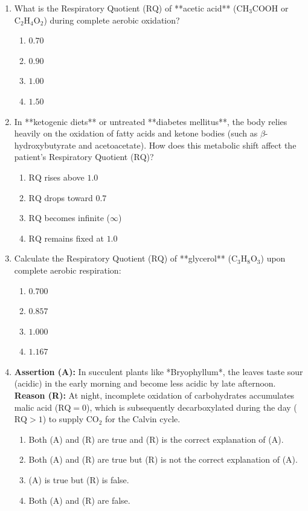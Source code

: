 \documentclass[11pt, a4paper]{article}
\begin{document}
\begin{enumerate}[label=\textbf{\arabic*.}]
\item What is the Respiratory Quotient ($\text{RQ}$) of **acetic acid** ($\text{CH}_3\text{COOH}$ or $\text{C}_2\text{H}_4\text{O}_2$) during complete aerobic oxidation?
\begin{enumerate}[label=(\Alph*)]
    \item $0.70$
    \item $0.90$
    \item $1.00$
    \item $1.50$
\end{enumerate}

\item In **ketogenic diets** or untreated **diabetes mellitus**, the body relies heavily on the oxidation of fatty acids and ketone bodies (such as $\beta$-hydroxybutyrate and acetoacetate). How does this metabolic shift affect the patient's Respiratory Quotient ($\text{RQ}$)?
\begin{enumerate}[label=(\Alph*)]
    \item $\text{RQ}$ rises above $1.0$
    \item $\text{RQ}$ drops toward $0.7$
    \item $\text{RQ}$ becomes infinite ($\infty$)
    \item $\text{RQ}$ remains fixed at $1.0$
\end{enumerate}

\item Calculate the Respiratory Quotient ($\text{RQ}$) of **glycerol** ($\text{C}_3\text{H}_8\text{O}_3$) upon complete aerobic respiration:
\begin{enumerate}[label=(\Alph*)]
    \item $0.700$
    \item $0.857$
    \item $1.000$
    \item $1.167$
\end{enumerate}

\item \textbf{Assertion (A):} In succulent plants like *Bryophyllum*, the leaves taste sour (acidic) in the early morning and become less acidic by late afternoon. \\
\textbf{Reason (R):} At night, incomplete oxidation of carbohydrates accumulates malic acid ($\text{RQ} = 0$), which is subsequently decarboxylated during the day ($\text{RQ} > 1$) to supply $\text{CO}_2$ for the Calvin cycle.
\begin{enumerate}[label=(\Alph*)]
    \item Both (A) and (R) are true and (R) is the correct explanation of (A).
    \item Both (A) and (R) are true but (R) is not the correct explanation of (A).
    \item (A) is true but (R) is false.
    \item Both (A) and (R) are false.
\end{enumerate}


\end{enumerate}
\end{document}
